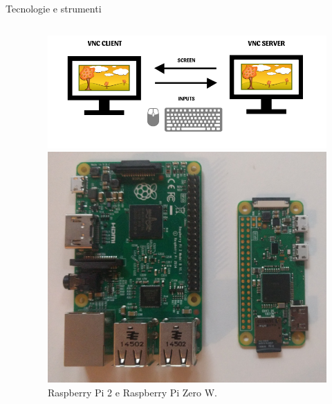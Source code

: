 \documentclass{beamer}
\begin{document}
\begin{frame}[fragile]{Tecnologie e strumenti}
\begin{columns}[T]
\begin{column}{.25\textwidth}
\end{column}%
\hfill%
\begin{column}{.60\textwidth}
    \begin{figure}[t!]
    \includegraphics[scale=2.0]{../img/vnc-client-server-cut.png}
    \caption{Interazione tra un client e un server VNC}
    \centering
    \includegraphics[scale=0.03]{../img/pi-comparison.jpg}
    \caption{Raspberry Pi 2 e Raspberry Pi Zero W.}
\end{figure}
\end{column}%
\end{columns}
\end{frame}
\end{document}
